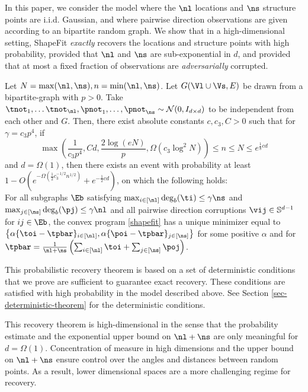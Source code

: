 In this paper, we consider the model where the $\nl$ locations and $\ns$ structure points are i.i.d. Gaussian, and where pairwise direction observations are given according to an \erdosrenyi bipartite random graph.  We show that in a high-dimensional setting, ShapeFit \emph{exactly} recovers the locations and structure points with high probability, provided that $\nl$ and $\ns$ are sub-exponential in $d$, and provided that at most a fixed fraction of observations are \emph{adversarially} corrupted.

\begin{theorem} \label{thm:bipartite-random}
Let $N = \max(\nl,\ns), n = \min(\nl, \ns)$. Let $G(\Vl \cup \Vs,E)$ be drawn from a bipartite-\erdosrenyi graph with $p >0$. Take $ \tnot_1, \ldots \tnot_{\nl}, \pnot_1, \ldots, \pnot_{\ns} \sim \mathcal{N}(0, I_{d \times d})$ to be independent from each other and $G$. Then, there exist absolute constants $c,c_3, C>0$ such that for $\gamma = c_3 p^4$, if \\
$$\max\left(\frac{1}{c_3 p^4}, Cd, \frac{2 \log(eN)}{p}, \Omega(c_3 \log^2 N)\right) \leq  n \le N \leq e^{\frac{1}{8}c d }$$ 
and $d = \Omega(1)$, then there exists an event with probability at least  $1 - O( e^{-\Omega(\frac{1}{2}c_3^{-1/2} n^{1/2})} + e^{-\frac{1}{2} cd})$, on which the following holds:\\[1em]
For all subgraphs $\Eb$ satisfying $\max_{i\in [\nl]} \deg_b(\ti) \leq \gamma \ns$ and $\max_{j \in [\ns]} \deg_b(\pj) \leq \gamma \nl$ and all pairwise direction corruptions  $\vij \in \mathbb{S}^{d-1}$ for $ij \in \Eb$,  the convex program \eqref{shapefit} has a unique minimizer equal to $\left\{\alpha \{\toi -\tpbar \}_{i \in [\nl]}, \alpha \{\poi -\tpbar\}_{j \in [\ns]}  \right\}$ for some positive $\alpha$ and for $\tpbar = \frac{1}{\nl + \ns} \left(\sum_{i \in [\nl]} \toi + \sum_{j \in [\ns]} \poj \right)$. 
\end{theorem}

This probabilistic recovery theorem is based on a set of deterministic conditions that we prove are sufficient to guarantee exact recovery.  These conditions are satisfied with high probability in the model described above.  See Section \ref{sec-deterministic-theorem} for the deterministic conditions.

This recovery theorem is high-dimensional in the sense that the probability estimate and the exponential upper bound on $\nl + \ns$ are only meaningful for $d= \Omega(1)$.  Concentration of measure in high dimensions and the upper bound on $\nl + \ns$ ensure control over the angles and distances between random points. As a result, lower dimensional spaces are a more challenging regime for recovery.  

